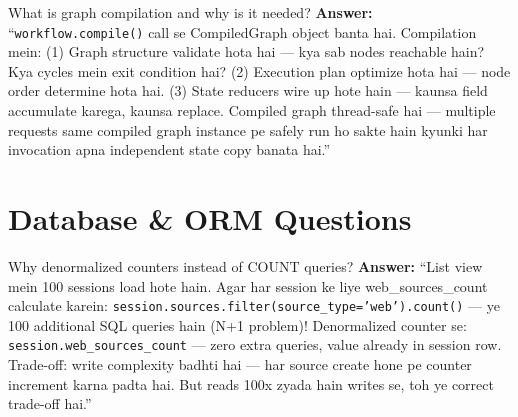 \documentclass[11pt,a4paper,twoside]{report}
\begin{document}
\begin{interviewbox}{What is graph compilation and why is it needed?}
\textbf{Answer:} ``\texttt{workflow.compile()} call se CompiledGraph object banta hai. Compilation mein: (1) Graph structure validate hota hai --- kya sab nodes reachable hain? Kya cycles mein exit condition hai? (2) Execution plan optimize hota hai --- node order determine hota hai. (3) State reducers wire up hote hain --- kaunsa field accumulate karega, kaunsa replace. Compiled graph thread-safe hai --- multiple requests same compiled graph instance pe safely run ho sakte hain kyunki har invocation apna independent state copy banata hai.''
\end{interviewbox}

\section{Database \& ORM Questions}

\begin{interviewbox}{Why denormalized counters instead of COUNT queries?}
\textbf{Answer:} ``List view mein 100 sessions load hote hain. Agar har session ke liye web\_sources\_count calculate karein: \texttt{session.sources.filter(source\_type='web').count()} --- ye 100 additional SQL queries hain (N+1 problem)! Denormalized counter se: \texttt{session.web\_sources\_count} --- zero extra queries, value already in session row. Trade-off: write complexity badhti hai --- har source create hone pe counter increment karna padta hai. But reads 100x zyada hain writes se, toh ye correct trade-off hai.''
\end{interviewbox}
\end{document}
